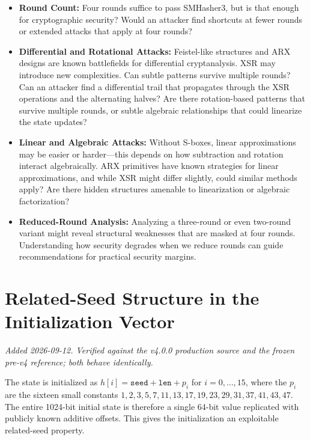 \documentclass[11pt,a4paper]{article}
\begin{document}
\begin{itemize}
  \item \textbf{Round Count:} Four rounds suffice to pass SMHasher3, but is that enough for cryptographic security? Would an attacker find shortcuts at fewer rounds or extended attacks that apply at four rounds?

  \item \textbf{Differential and Rotational Attacks:} Feistel-like structures and ARX designs are known battlefields for differential cryptanalysis. XSR may introduce new complexities. Can subtle patterns survive multiple rounds? Can an attacker find a differential trail that propagates through the XSR operations and the alternating halves? Are there rotation-based patterns that survive multiple rounds, or subtle algebraic relationships that could linearize the state updates?

  \item \textbf{Linear and Algebraic Attacks:} Without S-boxes, linear approximations may be easier or harder—this depends on how subtraction and rotation interact algebraically. ARX primitives have known strategies for linear approximations, and while XSR might differ slightly, could similar methods apply? Are there hidden structures amenable to linearization or algebraic factorization?

  \item \textbf{Reduced-Round Analysis:} Analyzing a three-round or even two-round variant might reveal structural weaknesses that are masked at four rounds. Understanding how security degrades when we reduce rounds can guide recommendations for practical security margins.
\end{itemize}

\section*{Related-Seed Structure in the Initialization Vector}
\emph{Added 2026-09-12. Verified against the v4.0.0 production source and the
frozen pre-v4 reference; both behave identically.}

The state is initialized as \( h[i] = \texttt{seed} + \texttt{len} + p_i \) for
\( i = 0,\dots,15 \), where the \( p_i \) are the sixteen small constants
\( 1,2,3,5,7,11,13,17,19,23,29,31,37,41,43,47 \). The entire 1024-bit initial
state is therefore a single 64-bit value replicated with publicly known
additive offsets. This gives the initialization an exploitable related-seed
property.
\end{document}
